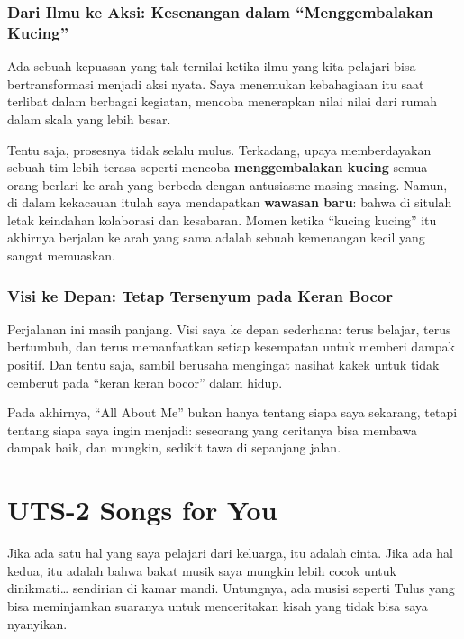 \documentclass[
  letterpaper,
  DIV=11,
  numbers=noendperiod]{scrreprt}
\begin{document}
\subsection{Dari Ilmu ke Aksi: Kesenangan dalam ``Menggembalakan
Kucing''}\label{dari-ilmu-ke-aksi-kesenangan-dalam-menggembalakan-kucing}

Ada sebuah kepuasan yang tak ternilai ketika ilmu yang kita pelajari
bisa bertransformasi menjadi aksi nyata. Saya menemukan kebahagiaan itu
saat terlibat dalam berbagai kegiatan, mencoba menerapkan nilai nilai
dari rumah dalam skala yang lebih besar.

Tentu saja, prosesnya tidak selalu mulus. Terkadang, upaya memberdayakan
sebuah tim lebih terasa seperti mencoba \textbf{menggembalakan kucing}
semua orang berlari ke arah yang berbeda dengan antusiasme masing
masing. Namun, di dalam kekacauan itulah saya mendapatkan
\textbf{wawasan baru}: bahwa di situlah letak keindahan kolaborasi dan
kesabaran. Momen ketika ``kucing kucing'' itu akhirnya berjalan ke arah
yang sama adalah sebuah kemenangan kecil yang sangat memuaskan.

\subsection{Visi ke Depan: Tetap Tersenyum pada Keran
Bocor}\label{visi-ke-depan-tetap-tersenyum-pada-keran-bocor}

Perjalanan ini masih panjang. Visi saya ke depan sederhana: terus
belajar, terus bertumbuh, dan terus memanfaatkan setiap kesempatan untuk
memberi dampak positif. Dan tentu saja, sambil berusaha mengingat
nasihat kakek untuk tidak cemberut pada ``keran keran bocor'' dalam
hidup.

Pada akhirnya, ``All About Me'' bukan hanya tentang siapa saya sekarang,
tetapi tentang siapa saya ingin menjadi: seseorang yang ceritanya bisa
membawa dampak baik, dan mungkin, sedikit tawa di sepanjang jalan.


\chapter{UTS-2 Songs for You}\label{uts-2-songs-for-you}

Jika ada satu hal yang saya pelajari dari keluarga, itu adalah cinta.
Jika ada hal kedua, itu adalah bahwa bakat musik saya mungkin lebih
cocok untuk dinikmati\ldots{} sendirian di kamar mandi. Untungnya, ada
musisi seperti Tulus yang bisa meminjamkan suaranya untuk menceritakan
kisah yang tidak bisa saya nyanyikan.
\end{document}
